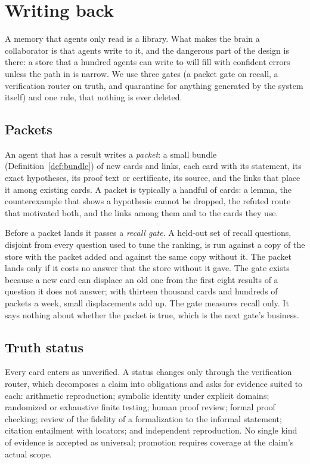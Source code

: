 \section{Writing back}\label{sec:writeback}

A memory that agents only read is a library. What makes the brain a collaborator is that agents write to it, and the dangerous part of the design is there: a store that a hundred agents can write to will fill with confident errors unless the path in is narrow. We use three gates (a packet gate on recall, a verification router on truth, and quarantine for anything generated by the system itself) and one rule, that nothing is ever deleted.

\subsection{Packets}
An agent that has a result writes a \emph{packet}: a small bundle (Definition~\ref{def:bundle}) of new cards and links, each card with its statement, its exact hypotheses, its proof text or certificate, its source, and the links that place it among existing cards. A packet is typically a handful of cards: a lemma, the counterexample that shows a hypothesis cannot be dropped, the refuted route that motivated both, and the links among them and to the cards they use.

Before a packet lands it passes a \emph{recall gate}. A held-out set of recall questions, disjoint from every question used to tune the ranking, is run against a copy of the store with the packet added and against the same copy without it. The packet lands only if it costs no answer that the store without it gave. The gate exists because a new card can displace an old one from the first eight results of a question it does not answer; with thirteen thousand cards and hundreds of packets a week, small displacements add up. The gate measures recall only. It says nothing about whether the packet is true, which is the next gate's business.

\subsection{Truth status}
Every card enters as \textsf{unverified}. A status changes only through the verification router, which decomposes a claim into obligations and asks for evidence suited to each: arithmetic reproduction; symbolic identity under explicit domains; randomized or exhaustive finite testing; human proof review; formal proof checking; review of the fidelity of a formalization to the informal statement; citation entailment with locators; and independent reproduction. No single kind of evidence is accepted as universal; promotion requires coverage at the claim's actual scope.

